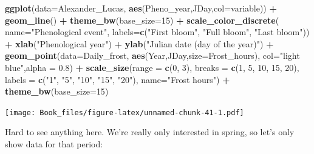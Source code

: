 \documentclass[
]{book}
\newenvironment{Shaded}{\begin{snugshade}}{\end{snugshade}}
\newcommand{\DataTypeTok}[1]{\textcolor[rgb]{0.13,0.29,0.53}{#1}}
\newcommand{\DecValTok}[1]{\textcolor[rgb]{0.00,0.00,0.81}{#1}}
\newcommand{\FloatTok}[1]{\textcolor[rgb]{0.00,0.00,0.81}{#1}}
\newcommand{\KeywordTok}[1]{\textcolor[rgb]{0.13,0.29,0.53}{\textbf{#1}}}
\newcommand{\NormalTok}[1]{#1}
\newcommand{\OperatorTok}[1]{\textcolor[rgb]{0.81,0.36,0.00}{\textbf{#1}}}
\newcommand{\StringTok}[1]{\textcolor[rgb]{0.31,0.60,0.02}{#1}}
\begin{document}
\begin{Shaded}
\begin{Highlighting}[]
\KeywordTok{ggplot}\NormalTok{(}\DataTypeTok{data=}\NormalTok{Alexander_Lucas,}
       \KeywordTok{aes}\NormalTok{(Pheno_year,JDay,}\DataTypeTok{col=}\NormalTok{variable)) }\OperatorTok{+}
\StringTok{  }\KeywordTok{geom_line}\NormalTok{() }\OperatorTok{+}
\StringTok{  }\KeywordTok{theme_bw}\NormalTok{(}\DataTypeTok{base_size=}\DecValTok{15}\NormalTok{) }\OperatorTok{+}
\StringTok{  }\KeywordTok{scale_color_discrete}\NormalTok{(}
    \DataTypeTok{name=}\StringTok{"Phenological event"}\NormalTok{,}
    \DataTypeTok{labels=}\KeywordTok{c}\NormalTok{(}\StringTok{"First bloom"}\NormalTok{, }\StringTok{"Full bloom"}\NormalTok{, }\StringTok{"Last bloom"}\NormalTok{)) }\OperatorTok{+}
\StringTok{  }\KeywordTok{xlab}\NormalTok{(}\StringTok{"Phenological year"}\NormalTok{) }\OperatorTok{+}
\StringTok{  }\KeywordTok{ylab}\NormalTok{(}\StringTok{"Julian date (day of the year)"}\NormalTok{) }\OperatorTok{+}
\StringTok{  }\KeywordTok{geom_point}\NormalTok{(}\DataTypeTok{data=}\NormalTok{Daily_frost,}
             \KeywordTok{aes}\NormalTok{(Year,JDay,}\DataTypeTok{size=}\NormalTok{Frost_hours),}
             \DataTypeTok{col=}\StringTok{"light blue"}\NormalTok{,}\DataTypeTok{alpha =} \FloatTok{0.8}\NormalTok{) }\OperatorTok{+}\StringTok{ }
\StringTok{  }\KeywordTok{scale_size}\NormalTok{(}\DataTypeTok{range =} \KeywordTok{c}\NormalTok{(}\DecValTok{0}\NormalTok{, }\DecValTok{3}\NormalTok{),}
             \DataTypeTok{breaks =} \KeywordTok{c}\NormalTok{(}\DecValTok{1}\NormalTok{, }\DecValTok{5}\NormalTok{, }\DecValTok{10}\NormalTok{, }\DecValTok{15}\NormalTok{, }\DecValTok{20}\NormalTok{),}
             \DataTypeTok{labels =} \KeywordTok{c}\NormalTok{(}\StringTok{"1"}\NormalTok{, }\StringTok{"5"}\NormalTok{, }\StringTok{"10"}\NormalTok{, }\StringTok{"15"}\NormalTok{, }\StringTok{"20"}\NormalTok{),}
             \DataTypeTok{name=}\StringTok{"Frost hours"}\NormalTok{) }\OperatorTok{+}
\StringTok{  }\KeywordTok{theme_bw}\NormalTok{(}\DataTypeTok{base_size=}\DecValTok{15}\NormalTok{)}
\end{Highlighting}
\end{Shaded}

\texttt{[image: Book\_files/figure-latex/unnamed-chunk-41-1.pdf]}

Hard to see anything here. We're really only interested in spring, so let's only show data for that period:
\end{document}
